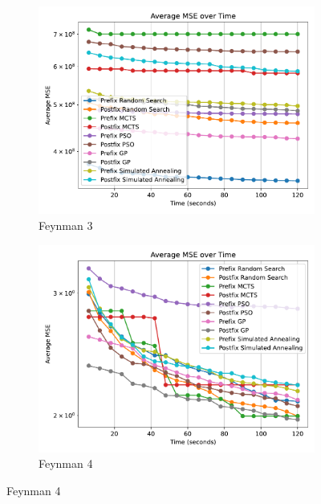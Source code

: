 \documentclass[runningheads]{llncs}
\begin{document}
\begin{figure}[]
    \vspace{0.5cm}
    
    \begin{subfigure}[b]{0.4\textwidth}
        \includegraphics[width=\linewidth, keepaspectratio]{AIFeynman_Benchmarks/Feynman_Benchmark_3.pdf}
        \caption{Feynman 3}
        \label{subfig:feynman_3}
    \end{subfigure}
    \begin{subfigure}[b]{0.4\textwidth}
        \includegraphics[width=\linewidth, keepaspectratio]{AIFeynman_Benchmarks/Feynman_Benchmark_4.pdf}
        \caption{Feynman 4}
        \label{subfig:feynman_4}
    \end{subfigure}
    

\end{figure}
\end{document}
